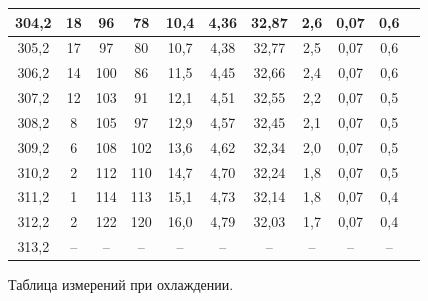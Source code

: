 \begin{center}
\begin{tabular}{|c|c|c|c|c|c|c|c|c|c|c|}
\hline 
     304,2     &    18      &       96    &       78   &     10,4  &   4,36  &     32,87      &     2,6     &       0,07    &            0,6          \\
\hline 
        305,2  &      17    &    97       &   80       &    10,7   &   4,38  &       32,77    &      2,5    &        0,07   &          0,6            \\
\hline 
      306,2    &      14    &     100      &    86      &  11,5     &  4,45   &       32,66    &     2,4     &        0,07   &          0,6            \\
\hline 
        307,2  &      12    &       103    &   91       &   12,1    &    4,51 &     32,55      &     2,2     &       0,07    &        0,5              \\
\hline 
     308,2     &       8   &     105      &     97     &  12,9     &    4,57 &     32,45      &       2,1   &      0,07     &             0,5        \\
\hline 
       309,2   &   6       &     108      &     102     &       13,6&   4,62  &      32,34    &      2,0    &     0,07      &        0,5             \\
\hline
    310,2      &     2     &    112       &      110    &   14,7    &   4,70  &       32,24    &      1,8    &    0,07       &        0,5             \\
\hline 
      311,2    &      1    &     114      &      113    &    15,1   &   4,73  &      32,14     &      1,8    &     0,07      &           0,4          \\
\hline 
     312,2    &     2     &       122    &       120   &     16,0  &   4,79  &    32,03       &     1,7     &      0,07     &          0,4           \\
\hline 
      313,2    &   --       &     --      &      --    &    --   &   --  &    --       &     --     &      --     &    --         \\
\hline 

\end{tabular}

\end{center}
Таблица измерений при охлаждении.

